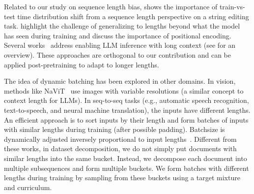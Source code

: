 Related to our study on sequence length bias, \cite{varivs2021sequence} shows the importance of train-vs-test time distribution shift from a sequence length perspective on a string editing task. \cite{anil2022exploring,zhou2024transformers,kazemnejad2024impact,liu2023scaling} highlight the challenge of generalizing to lengths beyond what the model has seen during training and discuss the importance of positional encoding. Several works~\citep{mohtashami2024random,zhu2023pose,han2023lm,xiong2023effective,chen2023extending,ntkaware,peng2023yarn,ruoss2023randomized,liu2024world} address enabling LLM inference with long context (see \cite{pawar2024and} for an overview). These approaches are orthogonal to our contribution and can be applied post-pretraining to adapt to longer lengths. 

The idea of dynamic batching has been explored in other domains. In vision, methods like NaViT~\citep{dehghani2024patch,mehta2022cvnets} use images with variable resolutions (a similar concept to context length for LLMs). In seq-to-seq tasks (e.g., automatic speech recognition, text-to-speech, and neural machine translation), the inputs have different lengths. An efficient approach is to sort inputs by their length and form batches of inputs with similar lengths during training (after possible padding). Batchsize is dynamically adjusted inversely proportional to input lengths~\citep{ge2021speed,gonzalez2023batching}. Different from these works, in dataset decomposition, we do not simply put documents with similar lengths into the same bucket. Instead, we decompose each document into multiple subsequences and form multiple buckets. We form batches with different lengths during training by sampling from these buckets using a target mixture and curriculum.
